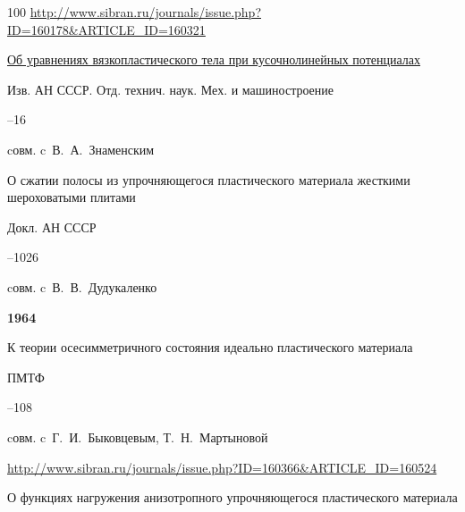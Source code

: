\begin{thebibliography}{100}
\elink \url{http://www.sibran.ru/journals/issue.php?ID=160178&ARTICLE_ID=160321}






\paper \href{https://zbmath.org/?q=an:0133.18302}{Об уравнениях вязкопластического тела при кусочнолинейных потенциалах}

\jour Изв. АН СССР. Отд. технич. наук. Мех. и машиностроение



–16 

\miscnote cовм. c~В.~А.~Знаменским





\paper О сжатии полосы из упрочняющегося пластического материала жесткими шероховатыми плитами 

\jour Докл. АН СССР




–1026 

\miscnote cовм. c~В.~В.~Дудукаленко





\pagebreak



\item[] \centerline{\bf 1964}






\paper К теории осесимметричного состояния идеально пластического материала 

\jour ПМТФ



–108 

\miscnote cовм. c~Г.~И.~Быковцевым, Т.~Н.~Мартыновой

\elink \url{http://www.sibran.ru/journals/issue.php?ID=160366&ARTICLE_ID=160524}






\paper О функциях нагружения анизотропного упрочняющегося пластического материала 


\end{thebibliography}
